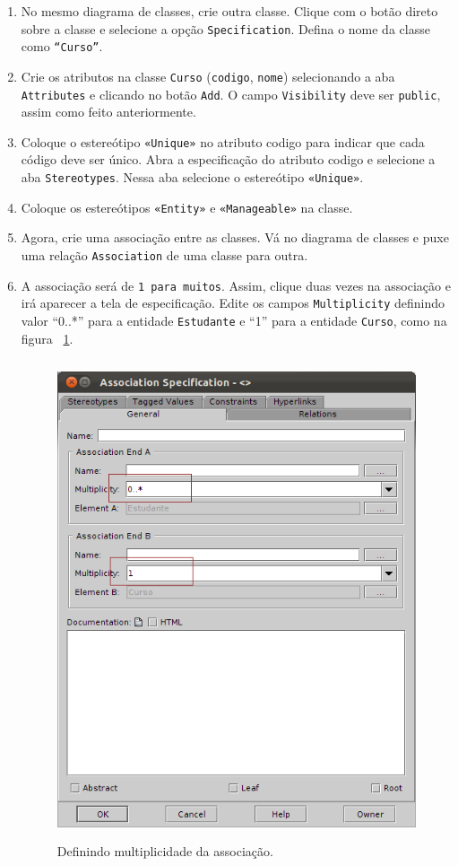 \begin{enumerate}
\item No mesmo diagrama de classes, crie outra classe. Clique com o botão direto
sobre a classe e selecione a opção \texttt{Specification}. Defina o nome da classe como
\texttt{“Curso”}.
	
\item Crie os atributos na classe \texttt{Curso} (\texttt{codigo},
\texttt{nome}) selecionando a aba \texttt{Attributes} e clicando no botão
\texttt{Add}. O campo \texttt{Visibility} deve ser \texttt{public}, assim como
feito anteriormente.

\item Coloque o estereótipo \texttt{«Unique»} no atributo codigo para indicar
que cada código deve ser único. Abra a especificação do atributo codigo e
selecione a aba \texttt{Stereotypes}. Nessa aba selecione o estereótipo
\texttt{«Unique»}.
	
\item Coloque os estereótipos \texttt{«Entity»} e \texttt{«Manageable»}  na
classe.
	
\item Agora, crie uma associação entre as classes. Vá no diagrama de classes e
puxe uma relação \texttt{Association} de uma classe para outra.
	
\item A associação será de \texttt{1 para muitos}. Assim, clique duas vezes na
associação e irá aparecer a tela de especificação. Edite os campos
\texttt{Multiplicity} definindo valor “0..*” para a entidade \texttt{Estudante}
e “1” para a entidade \texttt{Curso}, como na figura
~\ref{define_multiplicidade_associacao}.
\begin{figure}[H]
	\centering
	\includegraphics[width=350pt,height=400pt]{imgs/tutorial-mdarte-0005.png}
	\caption{Definindo multiplicidade da associação.}
	\label{define_multiplicidade_associacao}
\end{figure}
	

\end{enumerate}
